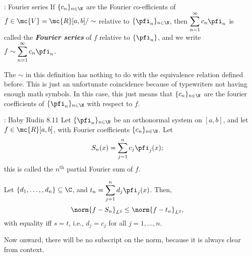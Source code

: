 \begin{ndef}{: Fourier series}
    If \(\{c_n\}_{n\in\N}\) are the Fourier co-efficients of \(f\in\mc{V}=\mc{R}[a,b]/\sim\) relative to \(\{\pfi_n\}_{n\in\N}\), then \(\displaystyle\sum_{n=1}^{\infty}c_n\pfi_n\) is called the \emph{\textbf{Fourier series}} of \(f\) relative to \(\{\pfi_n\}\), and we write \(f\sim \displaystyle\sum_{n=1}^{\infty}c_n\pfi_n\).
\end{ndef}
\begin{note}
    The \(\sim\) in this definition has nothing to do with the equivalence relation defined before. This is just an unfortunate coincidence because of typewriters not having enough math symbols. In this case, this just means that \(\{c_n\}_{n\in\N}\) are the fourier coefficients of \(\{\pfi_n\}_{n\in\N}\) with respect to \(f\).
\end{note}

\begin{ntheorem}{: Baby Rudin 8.11}
    Let \(\{\pfi_n\}_{n\in\N}\) be an orthonormal system on \([a,b]\), and let \(f\in\mc{R}[a,b]\), with Fourier coefficients \(\{c_n\}_{n\in\N}\). Let
    \begin{equation*} 
        S_n(x)=\sum_{j=1}^n c_j\pfi_j(x);
    \end{equation*}
    this is called the \(n^{\text{th}}\) partial Fourier sum of \(f\).

    \medskip

    Let \(\{d_1,\dots,,d_n\}\subseteq\C\), and \(t_n=\displaystyle\sum_{j=1}^n d_j\pfi_j(x)\). Then,
    \begin{equation*} 
        \norm{f-S_n}_{L^2}\leq\norm{f-t_n}_{L^2},
    \end{equation*}
    with equality iff \(s=t\), i.e., \(d_j=c_j\) for all \(j=1,\dots,n\).
\end{ntheorem}
\begin{notation}
    Now onward, there will be no subscript on the norm, because it is always clear from context.
\end{notation}

